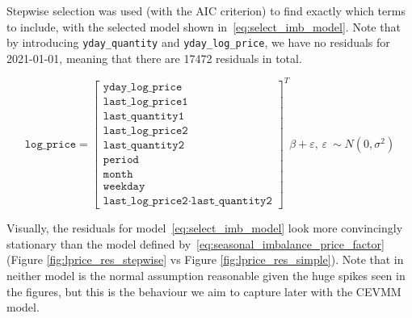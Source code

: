 \documentclass[11pt,twoside,openany]{book}
\newcommand{\eps}{\varepsilon}
\newcommand{\code}[1]{\texttt{#1}}
\numberwithin{Theorem}{chapter}
\numberwithin{Definition}{chapter}
\numberwithin{Lemma}{chapter}
\numberwithin{Algorithm}{chapter}
\numberwithin{equation}{chapter}
\begin{document}
Stepwise selection was used (with the AIC criterion) to find exactly which terms to include,
with the selected model shown in~\eqref{eq:select_imb_model}.
Note that by introducing \code{yday_quantity} and \code{yday_log_price},
we have no residuals for 2021-01-01, meaning that there are 17472 residuals in total.

\begin{equation}\label{eq:select_imb_model}
  \code{log_price} = \begin{bmatrix}
    \code{yday_log_price} \\
    \code{last_log_price1}\\
    \code{last_quantity1}\\
    \code{last_log_price2}\\
    \code{last_quantity2}\\
    \code{period} \\
    \code{month} \\
    \code{weekday}\\
  \code{last_log_price2}\cdot\code{last_quantity2}
\end{bmatrix}^T\beta + \eps,\,\eps~\sim N(0,\sigma^2)
\end{equation}

Visually, the residuals for model~\ref{eq:select_imb_model} look more
convincingly stationary
than the model defined by~\eqref{eq:seasonal_imbalance_price_factor}
(Figure \ref{fig:lprice_res_stepwise} vs Figure \ref{fig:lprice_res_simple}).
Note that in neither model is the normal assumption reasonable given the huge spikes seen
in the figures, but this is the behaviour we aim to capture later with the CEVMM model.

\FloatBarrier
\end{document}
